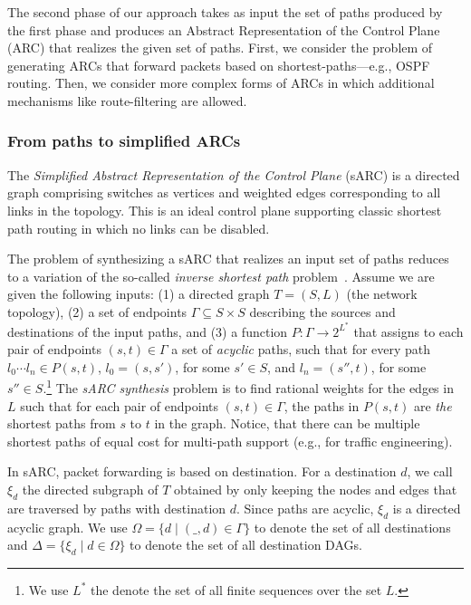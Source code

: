 The second phase of our approach takes as input the set of paths produced by the first phase
and produces an Abstract Representation of the Control Plane (ARC) that realizes the given set of paths.
First, we consider the problem of generating ARCs that
 forward packets based on shortest-paths---e.g., OSPF routing.
Then, we consider more complex forms of ARCs in which 
 additional mechanisms like route-filtering are allowed. 
 
\subsubsection{From paths to simplified ARCs} \label{sec:sarc}
The \emph{Simplified Abstract Representation of the Control Plane} (sARC) is a directed graph comprising switches as 
vertices and weighted edges corresponding to all links in the
topology. 
This is an ideal control plane supporting classic shortest path routing in which no links can be disabled. 

The problem of synthesizing 
a sARC that realizes an input set of paths reduces to a
variation of the so-called {\em inverse shortest path} problem~\cite{isp}. 
Assume we are given the following inputs: (1) a directed graph $T = (S, L)$ (the network topology), 
(2) a set of endpoints $\Gamma \subseteq S\times S$
describing the sources and destinations of the input paths, and 
(3) a function $P: \Gamma \rightarrow 2^{L^*}$
that assigns to each pair of endpoints $(s,t) \in \Gamma$ 
a set of \emph{acyclic} paths, such that for every path $l_0\cdots l_n\in P(s,t)$,
$l_0=(s,s')$, for some $s'\in S$, and $l_n=(s'',t)$, for some $s''\in S$.\footnote{
We use $L^*$ the denote the set of all finite sequences over the set $L$.}
The 
\emph{sARC synthesis}
problem is to find rational weights for the edges in $L$ such that 
for each pair of endpoints $(s,t) \in \Gamma$, 
the paths in $P(s,t)$ are \emph{the} shortest paths from $s$ to $t$ 
in the graph. Notice, that there can be multiple shortest
paths of equal cost for multi-path support (e.g., for traffic engineering).

In sARC, packet forwarding is based on destination.
For a destination $d$, we call $\xi_d$ the directed
subgraph of $T$ obtained by only keeping the nodes and edges 
that are traversed by paths with destination $d$.
Since paths are acyclic, $\xi_d$ is a directed acyclic graph.
We use $\Omega=\{d\mid (\_,d)\in\Gamma\}$ to denote the 
set of all destinations and $\Delta=\{\xi_d\mid d\in \Omega\}$ to denote  
the set of all destination DAGs. 

